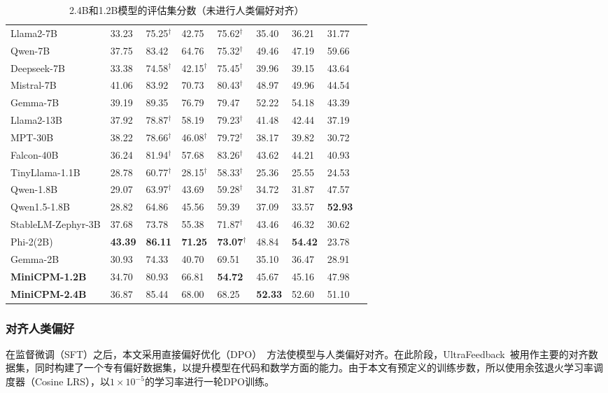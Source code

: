 \begin{table}[!htbp]
{\begin{tabular}{lm{1.2cm}m{1.2cm}m{1.2cm}m{1.7cm}m{1.2cm}m{1.2cm}m{1.2cm}m{1.2cm}}
\midrule
Llama2-7B  & 33.23 & 75.25$^{\dag}$ & 42.75 & 75.62$^{\dag}$ & 35.40 & 36.21 & 31.77 \\
Qwen-7B  & 37.75 & 83.42 & 64.76 & 75.32$^{\dag}$ & 49.46 & 47.19 & 59.66 \\
Deepseek-7B  & 33.38 & 74.58$^{\dag}$ & 42.15$^{\dag}$ & 75.45$^{\dag}$ & 39.96 & 39.15 & 43.64 \\
Mistral-7B & 41.06 & 83.92 & 70.73 & 80.43$^{\dag}$ & 48.97 & 49.96 & 44.54 \\
Gemma-7B  & 39.19 & 89.35 & 76.79 & 79.47 & 52.22 & 54.18 & 43.39 \\
\midrule
Llama2-13B & 37.92 & 78.87$^{\dag}$ & 58.19 & 79.23$^{\dag}$ & 41.48 & 42.44 & 37.19 \\
MPT-30B  & 38.22 & 78.66$^{\dag}$ & 46.08$^{\dag}$ & 79.72$^{\dag}$ & 38.17 & 39.82 & 30.72 \\
Falcon-40B & 36.24 & 81.94$^{\dag}$ & 57.68 & 83.26$^{\dag}$ & 43.62 & 44.21 & 40.93 \\
\midrule
TinyLlama-1.1B  & 28.78 & 60.77$^{\dag}$ & 28.15$^{\dag}$ & 58.33$^{\dag}$ & 25.36 & 25.55 & 24.53 \\
Qwen-1.8B  & 29.07 & 63.97$^{\dag}$ & 43.69 & 59.28$^{\dag}$ & 34.72 & 31.87 & 47.57 \\
Qwen1.5-1.8B  & 28.82 & 64.86 & 45.56 & 59.39 & 37.09 & 33.57 & \textbf{52.93} \\
StableLM-Zephyr-3B  & 37.68 & 73.78 & 55.38 & 71.87$^{\dag}$ & 43.46 & 46.32 & 30.62 \\
Phi-2(2B)  & \textbf{43.39} & \textbf{86.11} & \textbf{71.25} & \textbf{73.07$^{\dag}$} & 48.84 & \textbf{54.42} & 23.78 \\
Gemma-2B  & 30.93 & 74.33 & 40.70 & 69.51 & 35.10 & 36.47 & 28.91\\
\midrule
\textbf{MiniCPM-1.2B}  & 34.70 & 80.93 & 66.81 &  \textbf{54.72} &  45.67 & 45.16 & 47.98 \\
\textbf{MiniCPM-2.4B}  & 36.87 & 85.44 & 68.00 & 68.25 & \textbf{52.33} & 52.60 & 51.10 \\
\bottomrule
\end{tabular}
}
\caption{2.4B和1.2B模型的评估集分数（未进行人类偏好对齐）}
\label{tab:benchmark}
\end{table}

\subsubsection{对齐人类偏好}
\label{app:rlhf}
在监督微调（SFT）之后，本文采用直接偏好优化（DPO）~\citep{rafailov2024direct}方法使模型与人类偏好对齐。在此阶段，UltraFeedback~\citep{cui2023ultrafeedback}被用作主要的对齐数据集，同时构建了一个专有偏好数据集，以提升模型在代码和数学方面的能力。由于本文有预定义的训练步数，所以使用余弦退火学习率调度器（Cosine LRS），以$1\times 10^{-5}$的学习率进行一轮DPO训练。

